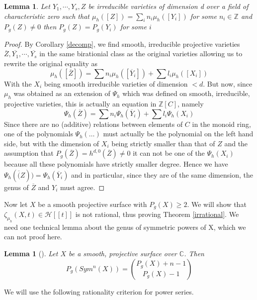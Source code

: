 \documentclass[11pt, a4paper, german]{article}
\theoremstyle{plain}
\newtheorem{lemma}[theorem]{Lemma}
\theoremstyle{definition}
\begin{document}
\begin{lemma}
    Let $Y_1,\cdots,Y_s,Z$ be irreducible varieties of dimension d over a field of characteristic zero 
    such that $\mu_h([Z]) = \sum_i n_i \mu_h([Y_i])$ for some $n_i \in \mathbb{Z}$ and $P_g(Z) \neq 0$ then $P_g(Z) = P_g(Y_i)$ for some $i$
\end{lemma}
\begin{proof}
    By Corollary \ref{decomp}, we find smooth, irreducible projective varieties $\overline{Z},\overline{Y_1},\cdots, \overline{Y_s}$ in the same
    birationial class as the original varieties allowing us to rewrite the original equality as 
    \[
        \mu_h([\overline{Z}]) = \sum n_i\mu_h([\overline{Y}_i]) + \sum l_i \mu_h([X_i])
    \]
    With the $X_i$ being smooth irreducible varieties of dimension $<d$.
    But now, since $\mu_h$ was obtained as an extension of $\Psi_h$ which was defined on smooth, irreducible, projective varieties, this is
    actually an equation in $\mathbb{Z}[C]$, namely
    \[
        \Psi_h(\overline{Z}) = \sum n_i \Psi_h(\overline{Y}_i) + \sum l_i\Psi_h(X_i)
    \]
    Since there are no (additive) relations between elements of $C$ in the monoid ring, one of the polynomials $\Psi_h(\dots)$ must actually
    be the polynomial on the left hand side, but with the dimension of $X_i$ being strictly smaller than that of $Z$ and the assumption that
    $P_g(\overline{Z}) = h^{d,0}(\overline{Z}) \neq 0$ it can not be one of the $\Psi_h(X_i)$ because all these polynomials have strictly smaller
    degree. Hence we have $\Psi_h(\overline(Z)) = \Psi_h(\overline{Y}_i)$ and in particular, since they are of the same dimension, the genus of
    $\overline{Z}$ and $Y_i$ must agree.
\end{proof}

Now let $X$ be a smooth projective surface with $P_g(X) \geq 2$. We will show that $\zeta_{\mu_h}(X,t) \in \mathcal{H}[[t]]$ is not rational,
thus proving Theorem \ref{irrational}. We need one technical lemma about the genus of symmetric powers of X, which we can not proof here.

\begin{lemma}[{\cite[Lem. 3.8]{MR1996804}}]
    Let $X$ be a smooth, projective surface over $\mathbb{C}$. Then
    \[
        P_g(Sym^n(X)) = \binom{P_g(X) + n - 1}{P_g(X) - 1}
    \]
\end{lemma}

We will use the following rationality criterion for power series.
\end{document}
